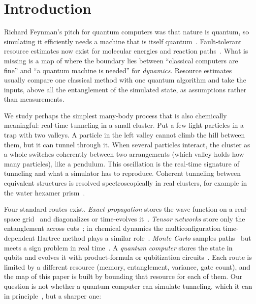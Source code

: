 \section{Introduction}
\label{sec:intro}

Richard Feynman's pitch for quantum computers was that nature is quantum, so simulating it efficiently
needs a machine that is itself quantum~\cite{feynman1982}. Fault-tolerant resource estimates now exist
for molecular energies and reaction paths~\cite{lee2021femoco,vonburg2021}. What is missing is a map of
where the boundary lies between ``classical computers are fine'' and ``a quantum machine is needed'' for
\emph{dynamics}. Resource estimates usually compare one classical method with one quantum algorithm and take
the inputs, above all the entanglement of the simulated state, as assumptions rather than measurements.

We study perhaps the simplest many-body process that is also chemically meaningful: real-time
tunneling in a small cluster. Put a few light particles in a trap with two valleys. A particle in the left
valley cannot climb the hill between them, but it can tunnel through it. When several particles interact,
the cluster as a whole switches coherently between two arrangements (which valley holds how many
particles), like a pendulum. This oscillation is the real-time signature of tunneling and what a simulator
has to reproduce. Coherent tunneling between equivalent structures is resolved spectroscopically in real
clusters, for example in the water hexamer prism~\cite{richardson2016}.

Four standard routes exist. \emph{Exact propagation} stores the wave function on a real-space
grid~\cite{kosloff1983,light2000} and diagonalizes or time-evolves it~\cite{lanczos1950,weisse2008,almohy2011}.
\emph{Tensor networks} store only the entanglement across cuts~\cite{white1992,vidal2004,schollwock2011,paeckel2019};
in chemical dynamics the multiconfiguration time-dependent Hartree method plays a similar
role~\cite{beck2000,wang2003}. \emph{Monte Carlo} samples paths~\cite{anderson1975,ceperley1980,sindzingre1989,richardson2011}
but meets a sign problem in real time~\cite{troyer2005,muhlbacher2008}. A \emph{quantum computer} stores the state in
qubits and evolves it with product-formula or qubitization
circuits~\cite{zalka1998,lloyd1996,kassal2008,childs2021trotter,low2019qubitization}. Each route is limited by a
different resource (memory, entanglement, variance, gate count), and the map of this paper is built by bounding
that resource for each of them. Our question is not whether a quantum computer can simulate tunneling, which it can in
principle~\cite{lloyd1996,buluta2009,georgescu2014}, but a sharper one:

